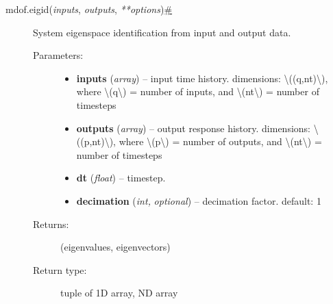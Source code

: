 \begin{description}
\item[{ {{mdof.}}{{eigid}}{(}\emph{{{inputs}}}, \emph{{{outputs}}},
\emph{{{**}}{{options}}}{)}\protect\hyperlink{mdof.eigid}{\#}}]
System eigenspace identification from input and output data.

\begin{description}
\item[Parameters{:}]
\begin{itemize}
\item
  \textbf{inputs} (\emph{array}) -- input time history. dimensions:
  {\textbackslash{}((q,nt)\textbackslash{})}, where
  {\textbackslash{}(q\textbackslash{})} = number of inputs, and
  {\textbackslash{}(nt\textbackslash{})} = number of timesteps
\item
  \textbf{outputs} (\emph{array}) -- output response history.
  dimensions: {\textbackslash{}((p,nt)\textbackslash{})}, where
  {\textbackslash{}(p\textbackslash{})} = number of outputs, and
  {\textbackslash{}(nt\textbackslash{})} = number of timesteps
\item
  \textbf{dt} (\emph{float}) -- timestep.
\item
  \textbf{decimation} (\emph{int,} \emph{optional}) -- decimation
  factor. default: 1
\end{itemize}
\item[Returns{:}]
(eigenvalues, eigenvectors)
\item[Return type{:}]
tuple of 1D array, ND array
\end{description}
\end{description}

